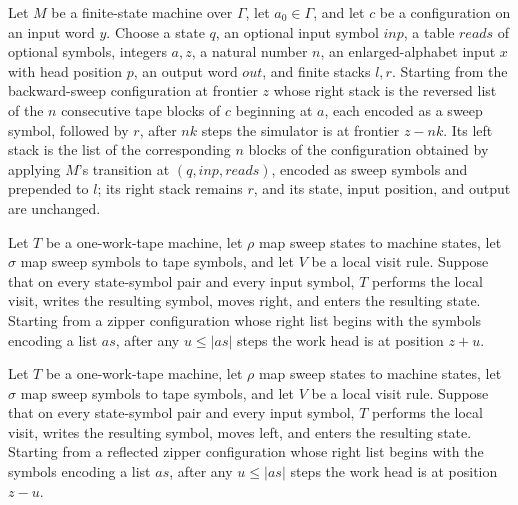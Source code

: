 \begin{lemma}
\label{Turing.FinTM.dg_write}
\leanok
{}
Let $M$ be a finite-state machine over $\Gamma$, let $a_0\in\Gamma$, and let $c$ be a
configuration on an input word $y$. Choose a state $q$, an optional input symbol
$\mathit{inp}$, a table $\mathit{reads}$ of optional symbols, integers $a,z$, a natural
number $n$, an enlarged-alphabet input $x$ with head position $p$, an output word
$\mathit{out}$, and finite stacks $l,r$. Starting from the backward-sweep configuration
at frontier $z$ whose right stack is the reversed list of the $n$ consecutive tape
blocks of $c$ beginning at $a$, each encoded as a sweep symbol, followed by $r$, after
$nk$ steps the simulator is at frontier $z-nk$. Its left stack is the list of the
corresponding $n$ blocks of the configuration obtained by applying $M$'s transition at
$(q,\mathit{inp},\mathit{reads})$, encoded as sweep symbols and prepended to $l$; its
right stack remains $r$, and its state, input position, and output are unchanged.
\end{lemma}

\begin{lemma}
\label{Turing.FinTM.dg_sweep_prefix}
\leanok
{}
Let $T$ be a one-work-tape machine, let $\rho$ map sweep states to machine states, let
$\sigma$ map sweep symbols to tape symbols, and let $V$ be a local visit rule. Suppose
that on every state-symbol pair and every input symbol, $T$ performs the local visit,
writes the resulting symbol, moves right, and enters the resulting state. Starting from
a zipper configuration whose right list begins with the symbols encoding a list $as$,
after any $u\le |as|$ steps the work head is at position $z+u$.
\end{lemma}

\begin{lemma}
\label{Turing.FinTM.dg_sweep_reverse_prefix}
\leanok
{}
Let $T$ be a one-work-tape machine, let $\rho$ map sweep states to machine states, let
$\sigma$ map sweep symbols to tape symbols, and let $V$ be a local visit rule. Suppose
that on every state-symbol pair and every input symbol, $T$ performs the local visit,
writes the resulting symbol, moves left, and enters the resulting state. Starting from a
reflected zipper configuration whose right list begins with the symbols encoding a list
$as$, after any $u\le |as|$ steps the work head is at position $z-u$.
\end{lemma}

